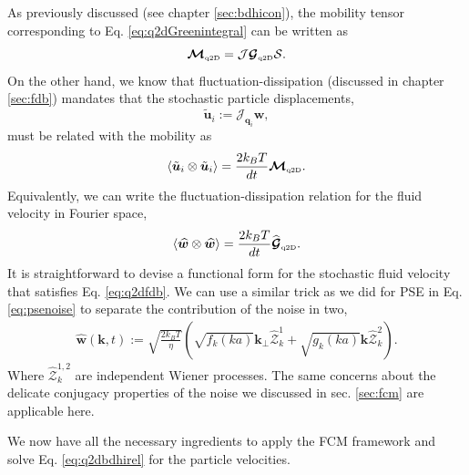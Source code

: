 \documentclass[ twoside,openright,titlepage,numbers=noenddot,%
headinclude,footinclude,cleardoublepage=empty,abstract=on,
BCOR=5mm,paper=b5,fontsize=11pt, dvipsnames
]{scrreprt}
\renewcommand{\vec}[1]{\bm{#1}}
\newcommand{\tens}[1]{\bm{\mathcal{#1}}}
\newcommand{\oper}[1]{\mathcal{#1}}
\newcommand{\kT}{k_B T}
\newcommand{\half}{\frac{1}{2}}
\newcommand{\fou}[1]{\widehat{#1}}
\newcommand{\ppos}{q}
\newcommand{\pvel}{u}
\newcommand{\qtd}{\text{\tiny q2D}}
\begin{document}
As previously discussed (see chapter \ref{sec:bdhicon}), the mobility tensor corresponding to Eq. \eqref{eq:q2dGreenintegral} can be written as
\begin{equation}
  \tens{M}_{\qtd} = \oper{J}\tens{G}_{\qtd}\oper{S}.
\end{equation}
On the other hand, we know that fluctuation-dissipation (discussed in chapter \ref{sec:fdb}) mandates that the stochastic particle displacements,
\begin{equation}
\tilde{\vec{\pvel}}_i := \oper{J}_{\vec{\ppos}_i}\vec{w},
\end{equation}
must be related with the mobility as
\begin{equation}
  \langle\tilde{\vec{\pvel}}_i\otimes\tilde{\vec{\pvel}}_i\rangle = \frac{2\kT}{dt} \tens{M}_{\qtd}.
\end{equation}
Equivalently, we can write the fluctuation-dissipation relation for the fluid velocity in Fourier space,
\begin{equation}
  \label{eq:q2dfdb}
  \left\langle\fou{\vec{w}}\otimes \fou{\vec{w}}\right\rangle = \frac{2\kT}{dt} \fou{\tens{G}}_{\qtd}.
\end{equation}
It is straightforward to devise a functional form for the stochastic fluid velocity that satisfies Eq. \eqref{eq:q2dfdb}.
We can use a similar trick as we did for \gls{PSE} in Eq. \eqref{eq:psenoise} to separate the contribution of the noise in two,
\begin{equation}
  \begin{aligned}
    \fou{\vec{w}}(\vec{k}, t) := \sqrt{\frac{2\kT}{\eta}}\left(\sqrt{f_k(ka)}\vec{k}_\perp\fou{\tens{Z}}^1_k + \sqrt{g_k(ka)}\vec{k}\fou{\tens{Z}}^2_k\right).
  \end{aligned}
\end{equation}
Where $\fou{\tens{Z}}^{1,2}_k$ are independent Wiener processes. The same concerns about the delicate conjugacy properties of the noise we discussed in sec. \ref{sec:fcm} are applicable here.

We now have all the necessary ingredients to apply the \gls{FCM} framework and solve Eq. \eqref{eq:q2dbdhirel} for the particle velocities.
\end{document}
